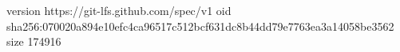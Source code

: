 version https://git-lfs.github.com/spec/v1
oid sha256:070020a894e10efc4ca96517c512bcf631dc8b44dd79e7763ea3a14058be3562
size 174916
